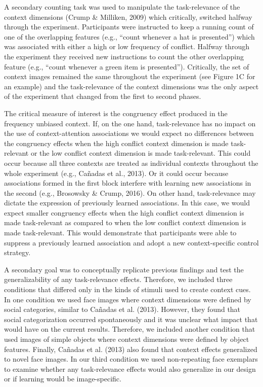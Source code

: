 \documentclass[english,,man,floatsintext]{apa6}
\begin{document}
A secondary counting task was used to manipulate the task-relevance of the context dimensions (Crump \& Milliken, 2009) which critically, switched halfway through the experiment. Participants were instructed to keep a running count of one of the overlapping features (e.g., \enquote{count whenever a hat is presented}) which was associated with either a high or low frequency of conflict. Halfway through the experiment they received new instructions to count the other overlapping feature (e.g., \enquote{count whenever a green item is presented}). Critically, the set of context images remained the same throughout the experiment (see Figure 1C for an example) and the task-relevance of the context dimensions was the only aspect of the experiment that changed from the first to second phases.

The critical measure of interest is the congruency effect produced in the frequency unbiased context. If, on the one hand, task-relevance has no impact on the use of context-attention associations we would expect no differences between the congruency effects when the high conflict context dimension is made task-relevant or the low conflict context dimension is made task-relevant. This could occur because all three contexts are treated as individual contexts throughout the whole experiment (e.g., Cañadas et al., 2013). Or it could occur because associations formed in the first block interfere with learning new associations in the second (e.g., Brosowsky \& Crump, 2016). On other hand, task-relevance may dictate the expression of previously learned associations. In this case, we would expect smaller congruency effects when the high conflict context dimension is made task-relevant as compared to when the low conflict context dimension is made task-relevant. This would demonstrate that participants were able to suppress a previously learned association and adopt a new context-specific control strategy.

A secondary goal was to conceptually replicate previous findings and test the generalizability of any task-relevance effects. Therefore, we included three conditions that differed only in the kinds of stimuli used to create context cues. In one condition we used face images where context dimensions were defined by social categories, similar to Cañadas et al. (2013). However, they found that social categorization occurred spontaneously and it was unclear what impact that would have on the current results. Therefore, we included another condition that used images of simple objects where context dimensions were defined by object features. Finally, Cañadas et al. (2013) also found that context effects generalized to novel face images. In our third condition we used non-repeating face exemplars to examine whether any task-relevance effects would also generalize in our design or if learning would be image-specific.
\end{document}
